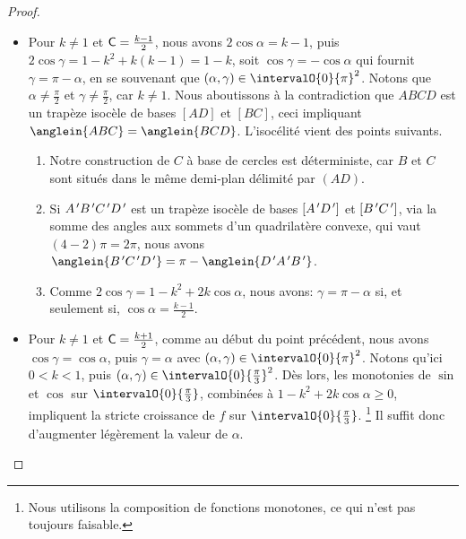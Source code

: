 \begin{proof}
\begin{itemize}
	    \item Pour $k \neq 1$ et $\mathsf{C} = \frac{k - 1}{2}$,
	    nous avons $2\cos \alpha = k - 1$, 
	    puis 
	    $2 \cos \gamma = 1 - k^2 + k(k - 1) = 1 - k$,
	    soit
	    $\cos \gamma = - \cos \alpha$ qui fournit
	    $\gamma = \pi - \alpha$, en se souvenant que $(\alpha , \gamma) \in \intervalO{0}{\pi}^2$.
	    Notons que $\alpha \neq \frac{\pi}{2}$ et $\gamma \neq \frac{\pi}{2}$, car $k \neq 1$. 
	    Nous aboutissons à la contradiction que $ABCD$ est un trapèze isocèle de bases $[AD]$ et $[BC]$, ceci impliquant $\anglein{ABC} = \anglein{BCD}$. 
	    L'isocélité vient des points suivants.
	    \begin{enumerate}
	        \item Notre construction de $C$ à base de cercles est déterministe, car $B$ et $C$ sont situés dans le même demi-plan délimité par $(AD)$.

	        \item Si $A^{\,\prime} B^{\,\prime} C^{\,\prime} D^{\,\prime}$ est un trapèze isocèle de bases $[A^{\,\prime} D^{\,\prime}]$ et $[B^{\,\prime} C^{\,\prime}]$, via la somme des angles aux sommets d'un quadrilatère convexe, qui vaut $(4 - 2) \pi = 2 \pi$, nous avons
	        $\anglein{\primeit{B} \primeit{C} \primeit{D}} = \pi - \anglein{\primeit{D} \primeit{A} \primeit{B}}$.

	        \item Comme $2 \cos \gamma = 1 - k^2 + 2 k \cos \alpha$, nous avons:
	        $\gamma = \pi - \alpha$ si, et seulement si, $\cos \alpha = \frac{k - 1}{2}$.
	    \end{enumerate}


	    \item Pour $k \neq 1$ et $\mathsf{C} = \frac{k + 1}{2}$,
	    comme au début du point précédent,
	    nous avons $\cos \gamma = \cos \alpha$, puis $\gamma = \alpha$ avec $(\alpha , \gamma) \in \intervalO{0}{\pi}^2$.
	    Notons qu'ici $0 < k < 1$, puis $(\alpha , \gamma) \in \intervalO{0}{\frac{\pi}{3}}^2$.
	    Dès lors, les monotonies de $\sin$ et $\cos$ sur $\intervalO{0}{\frac{\pi}{3}}$, combinées à $1 - k^2 + 2 k \cos \alpha \geq 0$, impliquent la stricte croissance de $f$ sur $\intervalO{0}{\frac{\pi}{3}}$.%
	    \footnote{
	    	Nous utilisons la composition de fonctions monotones, ce qui n'est pas toujours faisable.
	    }
	    Il suffit donc d'augmenter légèrement la valeur de  $\alpha$.
	\end{itemize}
	
	\null\vspace{-6ex}
\end{proof}


